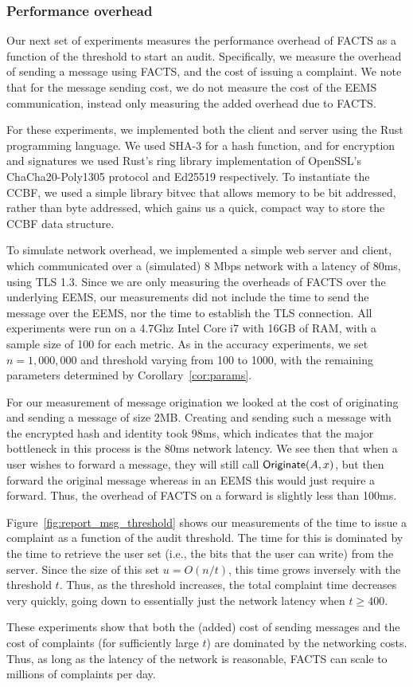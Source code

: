 \subsubsection{Performance overhead}

Our next set of experiments measures the performance overhead of FACTS as a function of the threshold to start an audit.  Specifically, we measure the overhead of sending a message using FACTS, and the cost of issuing a complaint.  We note that for the message sending cost, we do not measure the cost of the EEMS communication, instead only measuring the added overhead due to FACTS.

For these experiments, we implemented both the client and server using the Rust programming language.  We used SHA-3 for a hash function, and for encryption and signatures we used Rust's ring library\cite{ring} implementation of OpenSSL's ChaCha20-Poly1305 protocol and Ed25519 respectively. To instantiate the CCBF, we used a simple library bitvec\cite{bitvec} that allows memory to be bit addressed, rather than byte addressed, which gains us a quick, compact way to store the CCBF data structure. 

To simulate network overhead, we implemented a simple web server and client, which communicated over a (simulated) 8 Mbps network with a latency of 80ms, using TLS 1.3.  Since we are only measuring the overheads of FACTS over the underlying EEMS, our measurements 
did not include the time to send the message over the EEMS, nor the time to establish the TLS connection. All experiments were run on a 4.7Ghz Intel Core i7 with 16GB of RAM, with a sample size of 100 for each metric.  As in the accuracy experiments, we set $n=1,000,000$ and threshold varying from 100 to 1000, with the remaining parameters determined by Corollary~\ref{cor:params}.

For our measurement of message origination we looked at the cost of originating and sending a message of size 2MB. Creating and sending such a message with the encrypted hash and identity took 98ms, which indicates that the major bottleneck in this process is the 80ms network latency. We see then that when a user wishes to forward a message, they will still call $\textsf{Originate}(A,x)$, but then forward the original message whereas in an EEMS this would just require a forward.  Thus, the overhead of FACTS on a forward is slightly less than 100ms.

Figure~\ref{fig:report_msg_threshold} shows our measurements of the time to issue a complaint as a function of the audit threshold.  The time for this is dominated by the time to retrieve the user set (i.e., the bits that the user can write) from the server.  Since the size of this set $u=O(n/t)$, this time grows inversely with the threshold $t$.  Thus, as the threshold increases, the total complaint time decreases very quickly, going down to essentially just the network latency when $t\ge 400$.

These experiments show that both the (added) cost of sending messages and the cost of complaints (for sufficiently large $t$) are dominated by the networking costs.  Thus, as long as the latency of the network is reasonable, FACTS can scale to millions of complaints per day.